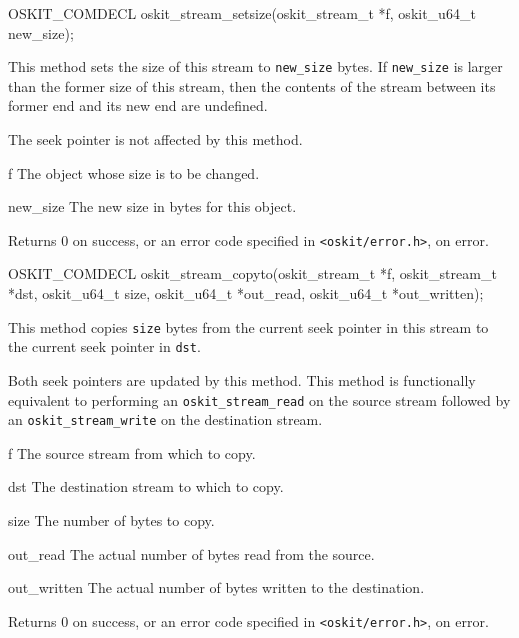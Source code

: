 \begin{apisyn}

	\funcproto OSKIT_COMDECL
	oskit_stream_setsize(oskit_stream_t *f, 
		            oskit_u64_t new_size);
\end{apisyn}
\begin{apidesc}
	This method sets the size of this stream to
	{\tt new_size} bytes.  If {\tt new_size}
	is larger than the former size of this stream,
	then the contents of the stream between its
	former end and its new end are undefined.

	The seek pointer is not affected by this method.
\end{apidesc}
\begin{apiparm}
	\item[f]
		The object whose size is to be changed.
	\item[new_size]
		The new size in bytes for this object.
\end{apiparm}
\begin{apiret}
	Returns 0 on success, or an error code specified in
	{\tt <oskit/error.h>}, on error.
\end{apiret}


\begin{apisyn}

	\funcproto OSKIT_COMDECL
	oskit_stream_copyto(oskit_stream_t *f, 
		           oskit_stream_t *dst,
		           oskit_u64_t size,
		           \outparam oskit_u64_t *out_read,
	                   \outparam oskit_u64_t *out_written);
\end{apisyn}
\begin{apidesc}
	This method copies {\tt size} bytes from
	the current seek pointer in this stream to
	the current seek pointer in {\tt dst}.

	Both seek pointers are updated by this method.
	This method is functionally equivalent to
	performing an {\tt oskit_stream_read} on the
	source stream followed by an {\tt oskit_stream_write}
	on the destination stream.
\end{apidesc}
\begin{apiparm}
	\item[f]
		The source stream from which to copy.
	\item[dst]
		The destination stream to which to copy.
	\item[size]
		The number of bytes to copy.
	\item[out_read]
		The actual number of bytes read from the source.
	\item[out_written]
		The actual number of bytes written to the destination. 
\end{apiparm}
\begin{apiret}
	Returns 0 on success, or an error code specified in
	{\tt <oskit/error.h>}, on error.
\end{apiret}



